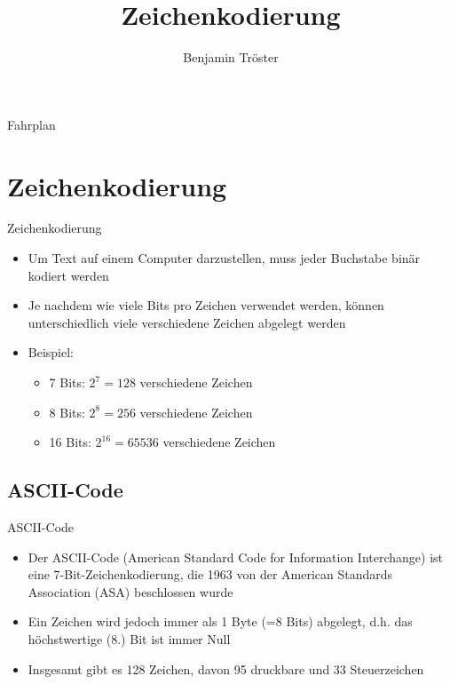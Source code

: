 \documentclass[12pt%
,xcolor=table
,aspectratio=169%
]{beamer}
\author{Benjamin Tröster}
\title[Zeichenkodierung]{Zeichenkodierung}
\institute[HTW Berlin]{Hochschule für Technik und Wirtschaft Berlin}
\begin{document}
\begin{frame}
\titlepage
\end{frame}

\begin{frame}{Fahrplan}
\tableofcontents[hideothersubsections]
\end{frame}

\section{Zeichenkodierung}

\begin{frame}{Zeichenkodierung}
\begin{itemize}
	\item Um Text auf einem Computer darzustellen, muss jeder Buchstabe binär kodiert werden
	\item Je nachdem wie viele Bits pro Zeichen verwendet werden, können unterschiedlich viele verschiedene Zeichen abgelegt werden
	\item Beispiel:
	\begin{itemize}
		\item 7 Bits: $2^7 = 128$ verschiedene Zeichen
		\item 8 Bits: $2^8 = 256$ verschiedene Zeichen
		\item 16 Bits: $2^{16} = 65536$ verschiedene Zeichen
	\end{itemize}
 \end{itemize}
\end{frame}

\subsection{ASCII-Code}
\begin{frame}{ASCII-Code}
\begin{itemize}
	\item Der ASCII-Code (American Standard Code for Information Interchange) ist eine 7-Bit-Zeichenkodierung, die 1963 von der American Standards Association (ASA) beschlossen wurde
	\item Ein Zeichen wird jedoch immer als 1 Byte (=8 Bits) abgelegt, d.h. das höchstwertige (8.) Bit ist immer Null
	\item Insgesamt gibt es 128 Zeichen, davon 95 druckbare und 33 Steuerzeichen
\end{itemize}
\end{frame}
\end{document}
